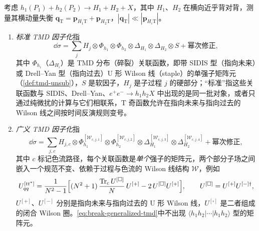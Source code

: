 \begin{definition}\label{def:break-generalized-tmd}
考虑 $h_1(P_1)+h_2(P_2)\to H_1+H_2+X$，其中 $H_1$、$H_2$ 在横向近乎背对背，测量其横动量失衡 $\boldsymbol q_{\mathrm T}=\boldsymbol p_{H_1\mathrm T}+\boldsymbol p_{H_2\mathrm T}$，$|\boldsymbol q_{\mathrm T}|\ll|\boldsymbol p_{H_i\mathrm T}|$。
\begin{enumerate}[label=(\roman*),leftmargin=2.2em,itemsep=1pt,topsep=2pt]
\item \emph{标准 TMD 因子化}指
\begin{equation}\label{eq:break-standard-tmd}
\dd\sigma=\sum_j H_j\otimes\Phi_{h_1}\otimes\Phi_{h_2}\otimes\Delta_{H_1}\otimes\Delta_{H_2}\otimes S+\text{幂次修正},
\end{equation}
其中 $\Phi_{h_i}$（$\Delta_{H_i}$）是 TMD 分布（碎裂）关联函数，即带 SIDIS 型（指向未来）或 Drell--Yan 型（指向过去）U 形 Wilson 线（staple）的单强子矩阵元（\cref{def:tmd-unsub}），$S$ 是软因子，$H_j$ 是子过程 $j$ 的硬部分；“标准”指这些关联函数与 SIDIS、Drell--Yan、$e^+e^-\to h_1h_2X$ 中出现的是同一批对象，或者只通过纯微扰的计算与它们相联系\cite{Collins2007}，T 奇函数允许在指向未来与指向过去的 Wilson 线之间按时间反演规则变号。
\item \emph{广义 TMD 因子化}\cite{BacchettaBomhofMuldersPijlman2005,Bomhof:2004aw,Bomhof:2006dp}指
\begin{equation}\label{eq:break-generalized-tmd}
\dd\sigma=\sum_{j,c}H_{j,c}\otimes\Phi^{[\mathcal W_{c,j,1}]}_{h_1}\otimes\Phi^{[\mathcal W_{c,j,2}]}_{h_2}\otimes\Delta^{[\mathcal W_{c,j,3}]}_{H_1}\otimes\Delta^{[\mathcal W_{c,j,4}]}_{H_2}+\text{幂次修正},
\end{equation}
其中 $c$ 标记色流路径，每个关联函数是\emph{单个}强子的矩阵元，两个部分子场之间嵌入一个规范不变、依赖于过程与色流的 Wilson 线结构 $\mathcal W$，例如\cite[式~(A11a)]{BacchettaBomhofMuldersPijlman2005}
\begin{equation}\label{eq:break-bbmp-link}
U^{[tt^*]}_{qq}=\frac{1}{N^2-1}\Big[(N^2+1)\,\frac{\operatorname{Tr}_{\mathrm{c}} U^{[\square]}}{N}\,U^{[+]}-2\,U^{[\square]}U^{[+]}\Big],\qquad U^{[\square]}=U^{[+]}U^{[-]\dagger},
\end{equation}
$U^{[+]}$、$U^{[-]}$ 分别是指向未来与指向过去的 U 形 Wilson 线，$U^{[\square]}$ 是二者组成的闭合 Wilson 圈。\cref{eq:break-generalized-tmd}中不出现 $\langle h_1h_2|\cdots|h_1h_2\rangle$ 型的矩阵元\cite[式~(3)]{RogersMulders2010}。
\end{enumerate}
\end{definition}

